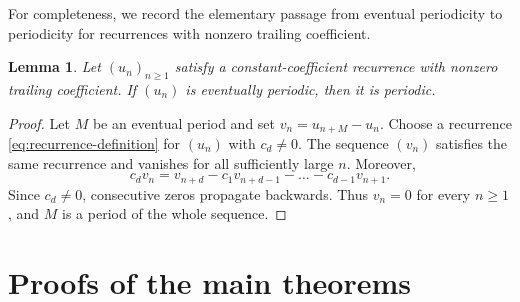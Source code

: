 \documentclass[11pt]{amsart}
\newtheorem{lemma}[theorem]{Lemma}
\theoremstyle{remark}
\numberwithin{equation}{section}
\begin{document}
For completeness, we record the elementary passage from eventual periodicity to
periodicity for recurrences with nonzero trailing coefficient.

\begin{lemma}\label{lem:eventual-periodic}
Let $(u_n)_{n\ge 1}$ satisfy a constant-coefficient recurrence with nonzero trailing
coefficient.  If $(u_n)$ is eventually periodic, then it is periodic.
\end{lemma}

\begin{proof}
Let $M$ be an eventual period and set $v_n=u_{n+M}-u_n$.  Choose a recurrence
\eqref{eq:recurrence-definition} for $(u_n)$ with $c_d\ne 0$.  The sequence $(v_n)$
satisfies the same recurrence and vanishes for all sufficiently large $n$.  Moreover,
\[
  c_d v_n=v_{n+d}-c_1v_{n+d-1}-\dots-c_{d-1}v_{n+1}.
\]
Since $c_d\ne 0$, consecutive zeros propagate backwards.  Thus $v_n=0$ for every
$n\ge 1$, and $M$ is a period of the whole sequence.
\end{proof}

\section{Proofs of the main theorems}\label{sec:main-proofs}
\end{document}
